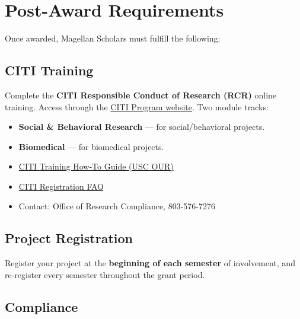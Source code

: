 \documentclass[11pt, letterpaper]{article}
\newcommand{\tipbox}[2]{%
\begin{tcolorbox}[colback=Black10, colframe=Garnet, title={\textbf{#1}}]
#2
\end{tcolorbox}
}
\begin{document}
\section{Post-Award Requirements}

Once awarded, Magellan Scholars must fulfill the following:

\subsection{CITI Training}

Complete the \textbf{CITI Responsible Conduct of Research (RCR)} online training. Access through the \href{https://about.citiprogram.org/}{CITI Program website}. Two module tracks:
\begin{itemize}[nosep]
    \item \textbf{Social \& Behavioral Research} --- for social/behavioral projects.
    \item \textbf{Biomedical} --- for biomedical projects.
\end{itemize}

\tipbox{CITI Training Resources}{
\begin{itemize}[nosep]
    \item \href{https://sc.edu/about/offices_and_divisions/undergraduate_research/documents/cititraininghowto.pdf}{CITI Training How-To Guide (USC OUR)}
    \item \href{https://sc.edu/about/offices_and_divisions/research_compliance/documents/citi_faq.pdf}{CITI Registration FAQ}
    \item Contact: Office of Research Compliance, 803-576-7276
\end{itemize}
}

\subsection{Project Registration}

Register your project at the \textbf{beginning of each semester} of involvement, and re-register every semester throughout the grant period.

\subsection{Compliance}
\end{document}
